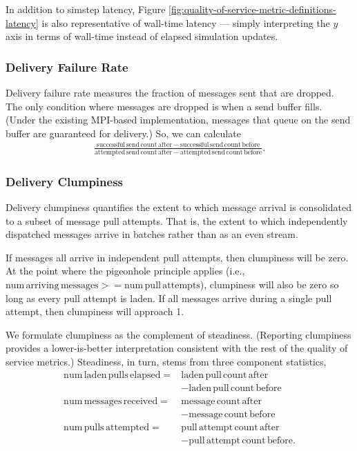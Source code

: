 In addition to simstep latency, Figure \ref{fig:quality-of-service-metric-definitions-latency} is also representative of wall-time latency --- simply interpreting the $y$ axis in terms of wall-time instead of elapsed simulation updates.

\subsubsection{Delivery Failure Rate} \label{sec:delivery-failure-rate-metric}

Delivery failure rate measures the fraction of messages sent that are dropped.
The only condition where messages are dropped is when a send buffer fills.
(Under the existing MPI-based implementation, messages that queue on the send buffer are guaranteed for delivery.)
So, we can calculate
\begin{align*}
  \frac{
    \mathrm{successful\,send\,count\,after} - \mathrm{successful\,send\,count\,before}
  }{
    \mathrm{attempted\,send\,count\,after} - \mathrm{attempted\,send\,count\,before}
  }.
\end{align*}

\subsubsection{Delivery Clumpiness} \label{sec:delivery-clumpiness-metric}

Delivery clumpiness quantifies the extent to which message arrival is consolidated to a subset of message pull attempts.
That is, the extent to which independently dispatched messages arrive in batches rather than as an even stream.

If messages all arrive in independent pull attempts, then clumpiness will be zero.
At the point where the pigeonhole principle applies (i.e., $\mathrm{num\,arriving\,messages} >= \mathrm{num\,pull\,attempts}$), clumpiness will also be zero so long as every pull attempt is laden.
If all messages arrive during a single pull attempt, then clumpiness will approach 1.

We formulate clumpiness as the complement of steadiness.
(Reporting clumpiness provides a lower-is-better interpretation consistent with the rest of the quality of service metrics.)
Steadiness, in turn, stems from three component statistics,
\begin{align*}
\mathrm{num\,laden\,pulls\,elapsed} =& \mathrm{laden\,pull\,count\,after} \\
  &- \mathrm{laden\,pull\,count\,before} \\
\mathrm{num\,messages\,received} =& \mathrm{message\,count\,after} \\
  &- \mathrm{message\,count\,before} \\
\mathrm{num\,pulls\,attempted} =& \mathrm{pull\,attempt\,count\,after} \\
  &- \mathrm{pull\,attempt\,count\,before}
.
\end{align*}

